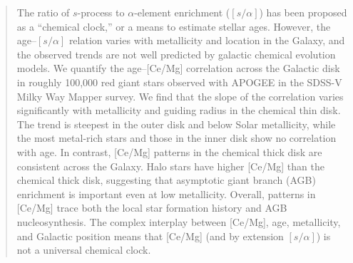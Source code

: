 \documentclass[twocolumn,twocolappendix]{aastex701}
\begin{document}
\author[0000-0003-1856-2151]{Danny Horta}
\email{}

\author[0000-0002-6972-6411]{Jos\'e Eduardo M\'endez-Delgado}
\email{}

\author[0000-0002-1379-4204]{Alexandre Roman Lopes}
\email{}

\author[0009-0005-0182-7186]{Amaya Sinha}
\email{}

\author[0009-0009-0081-4323]{Rodolfo de J.\ Zerme\~no}
\email{}

\author[0000-0003-2868-8276]{Jingkun Zhao}
\email{}



\begin{abstract}
    The ratio of $s$-process to $\alpha$-element enrichment ($[s/\alpha]$) has been proposed as a ``chemical clock,'' or a means to estimate stellar ages. However, the age--$[s/\alpha]$ relation varies with metallicity and location in the Galaxy, and the observed trends are not well predicted by galactic chemical evolution models. We quantify the age--[Ce/Mg] correlation across the Galactic disk in roughly 100,000 red giant stars observed with APOGEE in the SDSS-V Milky Way Mapper survey. We find that the slope of the correlation varies significantly with metallicity and guiding radius in the chemical thin disk. The trend is steepest in the outer disk and below Solar metallicity, while the most metal-rich stars and those in the inner disk show no correlation with age. In contrast, [Ce/Mg] patterns in the chemical thick disk are consistent across the Galaxy. Halo stars have higher [Ce/Mg] than the chemical thick disk, suggesting that asymptotic giant branch (AGB) enrichment is important even at low metallicity. Overall, patterns in [Ce/Mg] trace both the local star formation history and AGB nucleosynthesis. The complex interplay between [Ce/Mg], age, metallicity, and Galactic position means that [Ce/Mg] (and by extension $[s/\alpha]$) is not a universal chemical clock. 
\end{abstract}
\end{document}
